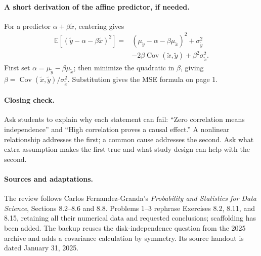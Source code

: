 \documentclass[11pt]{article}
\newcommand{\E}{\mathbb{E}}
\newcommand{\Cov}{\operatorname{Cov}}
\newcommand{\rv}[1]{\widetilde{#1}}
\begin{document}
\paragraph{A short derivation of the affine predictor, if needed.}
For a predictor $\alpha+\beta\rv{x}$, centering gives
\[
\begin{split}
  \E[(\rv{y}-\alpha-\beta\rv{x})^2]
  ={}&(\mu_{\rv{y}}-\alpha-\beta\mu_{\rv{x}})^2
      +\sigma_{\rv{y}}^2\\
     &-2\beta\Cov(\rv{x},\rv{y})+\beta^2\sigma_{\rv{x}}^2.
\end{split}
\]
First set $\alpha=\mu_{\rv{y}}-\beta\mu_{\rv{x}}$; then minimize the
quadratic in $\beta$, giving $\beta=\Cov(\rv{x},\rv{y})/\sigma_{\rv{x}}^2$.
Substitution gives the MSE formula on page 1.

\paragraph{Closing check.}
Ask students to explain why each statement can fail:
``Zero correlation means independence'' and ``High correlation proves a
causal effect.'' A nonlinear relationship addresses the first; a common
cause addresses the second. Ask what extra assumption makes the first true
and what study design can help with the second.

\paragraph{Sources and adaptations.}
The review follows Carlos Fernandez-Granda's
\emph{Probability and Statistics for Data Science}, Sections 8.2--8.6 and
8.8. Problems 1--3 rephrase Exercises 8.2, 8.11, and 8.15, retaining all
their numerical data and requested conclusions; scaffolding has been added.
The backup reuses the disk-independence question from the 2025 archive
and adds a covariance calculation by symmetry. Its source handout is
dated January 31, 2025.
\fi
\end{document}
